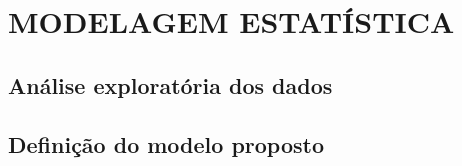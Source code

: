\chapter{MODELAGEM ESTATÍSTICA} %
\section{Análise exploratória dos dados}

\section{Definição do modelo proposto}
